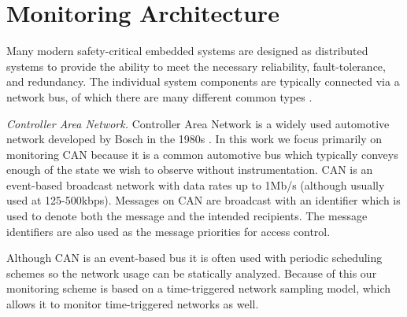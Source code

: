 
\section{Monitoring Architecture}

Many modern safety-critical embedded systems are designed as distributed systems to provide the ability to meet the necessary reliability, fault-tolerance, and redundancy. The individual system components are typically connected via a network bus, of which there are many different common types \cite{Rushby2001}. %
%

\textit{Controller Area Network.} %
Controller Area Network is a widely used automotive network developed by Bosch in the 1980s \cite{Bosch1991}. 
In this work we focus primarily on monitoring CAN because it is a common automotive bus which typically conveys enough of the state we wish to observe without instrumentation.
%
CAN is an event-based broadcast network with data rates up to 1Mb/s (although usually used at 125-500kbps). Messages on CAN are broadcast with an identifier which is used to denote both the message and the intended recipients. The message identifiers are also used as the message priorities for access control.

Although CAN is an event-based bus it is often used with periodic scheduling schemes so the network usage can be statically analyzed. Because of this our monitoring scheme is based on a time-triggered network sampling model, which allows it to monitor time-triggered networks as well.

